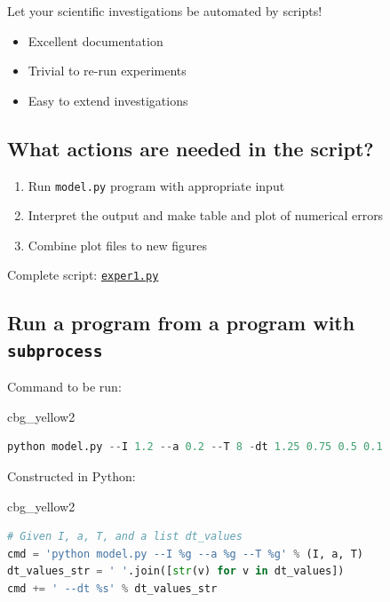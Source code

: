 \documentclass[%
oneside,                 %
final,                   %
10pt]{article}
\newenvironment{_cod_tight}[1]{
   \def\FrameCommand{\colorbox{#1}}
   \FrameRule0.6pt\MakeFramed {\FrameRestore}\vskip3mm}
   {\vskip0mm\endMakeFramed}
\newenvironment{cod}[1]{
\bgroup\rmfamily
\fboxsep=0mm\relax
\begin{_cod_tight}{#1}
\list{}{\parsep=-2mm\parskip=0mm\topsep=0pt\leftmargin=2mm
\rightmargin=2\leftmargin\leftmargin=4pt\relax}
\item\relax}
{\endlist\end{_cod_tight}\egroup}
\begin{document}
Let your scientific investigations be automated by
scripts!

\begin{itemize}
 \item Excellent documentation

 \item Trivial to re-run experiments

 \item Easy to extend investigations
\end{itemize}

\noindent
\subsection*{What actions are needed in the script?}

\begin{enumerate}
\item Run \texttt{model.py} program with appropriate input

\item Interpret the output and make table and plot of numerical errors

\item Combine plot files to new figures
\end{enumerate}

\noindent
Complete script: \href{{http://tinyurl.com/nc4upel/report_generation/exper1.py}}{\nolinkurl{exper1.py}}

\subsection*{Run a program from a program with \texttt{subprocess} }


Command to be run:

\begin{cod}{cbg_yellow2}\begin{lstlisting}[language=Python,style=simple,xleftmargin=2mm]
python model.py --I 1.2 --a 0.2 --T 8 -dt 1.25 0.75 0.5 0.1
\end{lstlisting}\end{cod}
\noindent

Constructed in Python:

\begin{cod}{cbg_yellow2}\begin{lstlisting}[language=Python,style=simple,xleftmargin=2mm]
# Given I, a, T, and a list dt_values
cmd = 'python model.py --I %g --a %g --T %g' % (I, a, T)
dt_values_str = ' '.join([str(v) for v in dt_values])
cmd += ' --dt %s' % dt_values_str
\end{lstlisting}\end{cod}
\noindent
\end{document}
